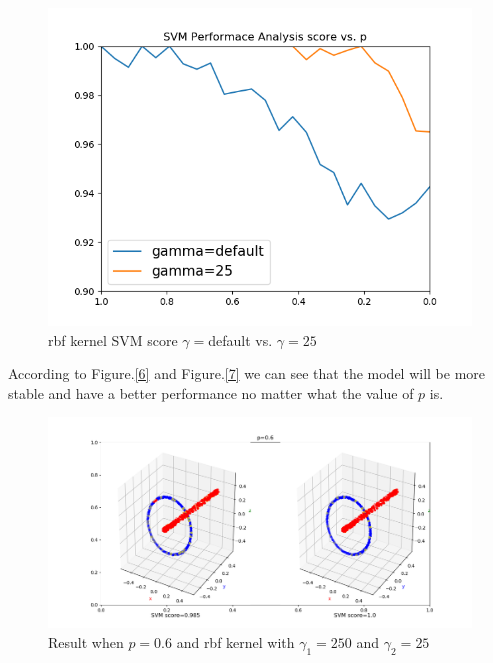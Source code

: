 \documentclass{article}
\begin{document}
\begin{figure}[H]
    \centering
    \includegraphics[scale=0.4]{svma2.png}
    \caption{rbf kernel SVM score $\gamma=$default vs. $\gamma=25$}
    \label{svma2}
\end{figure}
According to Figure.\ref{6} and Figure.\ref{7} we can see that the model will be more stable and have a better performance no matter what the value of $p$ is. 
\begin{figure}[H]
    \centering
    \includegraphics[scale=0.4]{8.png}
    \caption{Result when $p=0.6$ and rbf kernel with $\gamma_1=250$ and $\gamma_2=25$}
    \label{8}
\end{figure}
\end{document}
